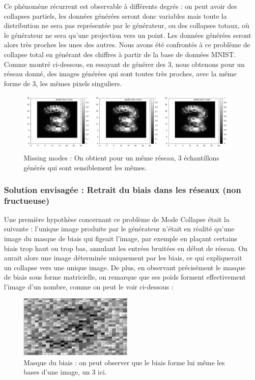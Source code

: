 Ce phénomène récurrent est observable à différents degrés : on peut avoir des collapses partiels, les données générées seront donc variables mais toute la distribution ne sera pas représentée par le générateur, ou des collapses totaux, où le générateur ne sera qu'une projection vers un point. Les données générées seront alors très proches les unes des autres.
Nous avons été confrontés à ce problème de collapse total en générant des chiffres à partir de la base de données MNIST. Comme montré ci-dessous, en essayant de générer des 3, nous obtenons pour un réseau donné, des images générées qui sont toutes très proches, avec la même forme de 3, les mêmes pixels singuliers.

\begin{figure}[ht]
\begin{center}
\includegraphics[width=1\textwidth]{images/missing_modes_2.png}\caption{Missing modes : On obtient pour un même réseau, 3 échantillons générés qui sont sensiblement les mêmes.}
\end{center}
\end{figure}


\subsubsection{Solution envisagée : Retrait du biais dans les réseaux (non fructueuse)}

Une première hypothèse concernant ce problème de Mode Collapse était la suivante : l'unique image produite par le générateur n'était en réalité qu'une image du masque de biais qui figeait l'image, par exemple en plaçant certains biais trop haut ou trop bas, annulant les entrées bruitées en début de réseau. On aurait alors une image déterminée uniquement par les biais, ce qui expliquerait un collapse vers une unique image.
De plus, en observant précisément le masque de biais sous forme matricielle, on remarque que ses poids forment effectivement l'image d'un nombre, comme on peut le voir ci-dessous :

\begin{figure}[ht]
\begin{center}
\includegraphics[width=0.5\textwidth]{images/masqueBiais.png}\caption{Masque du biais : on peut observer que le biais forme lui même les bases d'une image, un 3 ici.}
\end{center}
\end{figure}

